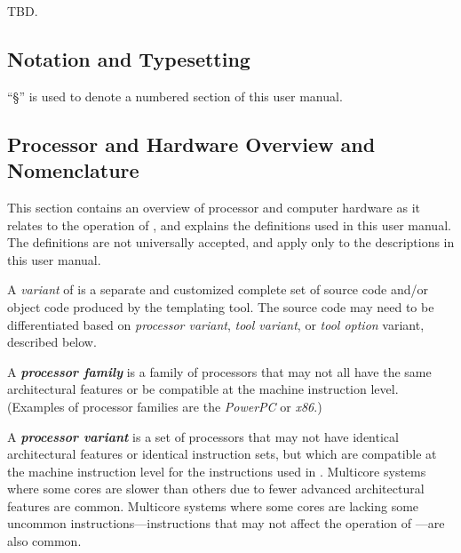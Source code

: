 TBD.



\subsection{Notation and Typesetting}
\label{cldd0:snom0:snts0}

``\S{}'' is used to denote a numbered section
of this user manual.


\subsection{Processor and Hardware Overview and Nomenclature}
\label{cldd0:snom0:spnc0}

This section contains an overview of processor and computer hardware
as it relates to the operation of \emph{\productbasenameshort{}},
and explains the definitions used in this user manual.  The definitions
are not universally accepted, and apply only to the descriptions in this
user manual.

A \emph{variant} of \emph{\productbasenameshort{}} is a separate
and customized complete set of \emph{\productbasenameshort{}}
source code and/or object code 
produced by the templating tool.  The
\emph{\productbasenameshort{}} source code may need to
be differentiated based on \emph{processor variant},
\emph{tool variant},
or \emph{tool option} variant, described below.

A \emph{\textbf{processor family}} is
a family of processors that may not all have the same 
architectural features or be compatible at the machine instruction 
level.  (Examples of processor families are the \emph{PowerPC} or 
\emph{x86}.)

A \emph{\textbf{processor variant}} is
a set of processors that may not have identical architectural
features or identical instruction sets, but which are compatible
at the machine instruction level for the instructions used in
\emph{\productbasenameshort{}}\@.  Multicore systems where
some cores are slower than others due to fewer advanced architectural
features are common.  Multicore systems where some cores are lacking
some uncommon instructions---instructions that may not affect
the operation of \emph{\productbasenameshort{}}---are also common.

